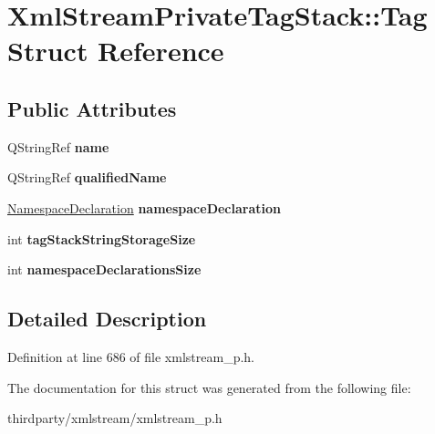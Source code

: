 \hypertarget{struct_xml_stream_private_tag_stack_1_1_tag}{}\section{Xml\+Stream\+Private\+Tag\+Stack\+:\+:Tag Struct Reference}
\label{struct_xml_stream_private_tag_stack_1_1_tag}
\subsection*{Public Attributes}
\begin{DoxyCompactItemize}
\item 
\mbox{\label{struct_xml_stream_private_tag_stack_1_1_tag_a20b063c040b8581a40b29b385323d4d3}} 
Q\+String\+Ref {\bfseries name}
\item 
\mbox{\label{struct_xml_stream_private_tag_stack_1_1_tag_acd4d7d19fd867aa160fb8b953bcc6fc6}} 
Q\+String\+Ref {\bfseries qualified\+Name}
\item 
\mbox{\label{struct_xml_stream_private_tag_stack_1_1_tag_a03989565b70f0df286871386228653fe}} 
\hyperlink{struct_xml_stream_private_tag_stack_1_1_namespace_declaration}{Namespace\+Declaration} {\bfseries namespace\+Declaration}
\item 
\mbox{\label{struct_xml_stream_private_tag_stack_1_1_tag_a98839de5912cde02455a80a93d1bfaaa}} 
int {\bfseries tag\+Stack\+String\+Storage\+Size}
\item 
\mbox{\label{struct_xml_stream_private_tag_stack_1_1_tag_abba7298aed24b25ff956aa4644aee229}} 
int {\bfseries namespace\+Declarations\+Size}
\end{DoxyCompactItemize}


\subsection{Detailed Description}


Definition at line 686 of file xmlstream\+\_\+p.\+h.



The documentation for this struct was generated from the following file\+:\begin{DoxyCompactItemize}
\item 
thirdparty/xmlstream/xmlstream\+\_\+p.\+h\end{DoxyCompactItemize}
